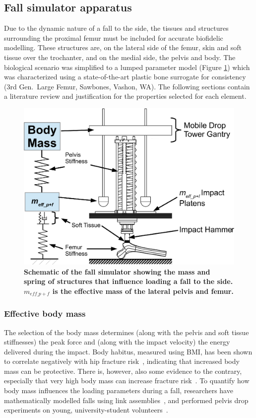 	\subsection{Fall simulator apparatus}
	\label{sec:fall_sim_design_methods_apparatus}
	Due to the dynamic nature of a fall to the side, the tissues and structures surrounding the proximal femur must be included for accurate biofidelic modelling.
	These structures are, on the lateral side of the femur, skin and soft tissue over the trochanter, and on the medial side, the pelvis and body.
	The biological scenario was simplified to a lumped parameter model (Figure \ref{fig:MassModel}) which was characterized using a state-of-the-art plastic bone surrogate for consistency (3rd Gen.\ Large Femur, Sawbones\texttrademark, Vashon, WA).
	The following sections contain a literature review and justification for the properties selected for each element.
	
	\begin{figure}
		\centering
		\includegraphics[width=.7\linewidth]{./impactor/figures/MassModel.eps}
		\caption[Schematic of the fall simulator]{\textbf{Schematic of the fall simulator showing the mass and spring of structures that influence loading a fall to the side.
		$m_{eff\_p+f}$ is the effective mass of the lateral pelvis and femur.}}
		\label{fig:MassModel}
	\end{figure}

		\subsubsection{Effective body mass}
		\label{sec:fall_sim_design_methods_apparatus_body}
		The selection of the body mass determines (along with the pelvis and soft tissue stiffnesses) the peak force and (along with the impact velocity) the energy delivered during the impact.
		Body habitus, measured using BMI, has been shown to correlate negatively with hip fracture risk~\citep{orwoll_finite_2009, parker_association_2008, nguyen_abdominal_2005, nguyen_identification_2005, minns_are_2007}, indicating that increased body mass can be protective.
		There is, however, also some evidence to the contrary, especially that very high body mass can increase fracture risk~\citep{nielson_bmi_2011}.
		To quantify how body mass influences the loading parameters during a fall, researchers have mathematically modelled falls using link assemblies~\citep{van_den_kroonenberg_dynamic_1995}, and performed pelvis drop experiments on young, university-student volunteers~\citep{robinovitch_prediction_1991, laing_characterizing_2010}.
		
